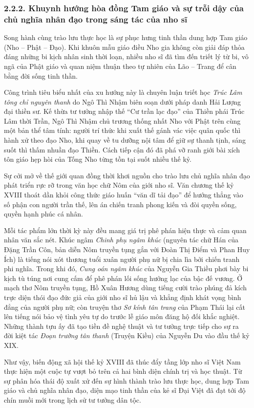 \subsubsection*{2.2.2. Khuynh hướng hòa đồng Tam giáo và sự trỗi dậy của chủ nghĩa nhân đạo trong sáng tác của nho sĩ}

Song hành cùng trào lưu thực học là sự phục hưng tinh thần dung hợp Tam giáo (Nho -- Phật -- Đạo). Khi khuôn mẫu giáo điều Nho gia không còn giải đáp thỏa đáng những bi kịch nhân sinh thời loạn, nhiều nho sĩ đã tìm đến triết lý từ bi, vô ngã của Phật giáo và quan niệm thuận theo tự nhiên của Lão -- Trang để cân bằng đời sống tinh thần.

Công trình tiêu biểu nhất của xu hướng này là chuyên luận triết học \textit{Trúc Lâm tông chỉ nguyên thanh} do Ngô Thì Nhậm biên soạn dưới pháp danh Hải Lượng đại thiền sư. Kế thừa tư tưởng nhập thế ``Cư trần lạc đạo'' của Thiền phái Trúc Lâm thời Trần, Ngô Thì Nhậm chủ trương thống nhất Nho với Phật trên cùng một bản thể tâm tính: người trí thức khi xuất thế gánh vác việc quân quốc thì hành xử theo đạo Nho, khi quay về tu dưỡng nội tâm để giữ sự thanh tịnh, sáng suốt thì thấm nhuần đạo Thiền. Cách tiếp cận đó đã phá vỡ ranh giới bài xích tôn giáo hẹp hòi của Tống Nho từng tồn tại suốt nhiều thế kỷ.

Sự cởi mở về thế giới quan đồng thời khơi nguồn cho trào lưu chủ nghĩa nhân đạo phát triển rực rỡ trong văn học chữ Nôm của giới nho sĩ. Văn chương thế kỷ XVIII thoát dần khỏi công thức giáo huấn ``văn dĩ tải đạo'' để hướng thẳng vào số phận con người trần thế, lên án chiến tranh phong kiến và đòi quyền sống, quyền hạnh phúc cá nhân.

Mỗi tác phẩm lớn thời kỳ này đều mang giá trị phê phán hiện thực và cảm quan nhân văn sắc nét. Khúc ngâm \textit{Chinh phụ ngâm khúc} (nguyên tác chữ Hán của Đặng Trần Côn, bản diễn Nôm truyền tụng gắn với Đoàn Thị Điểm và Phan Huy Ích) là tiếng nói xót thương tuổi xuân người phụ nữ bị chia lìa bởi chiến tranh phi nghĩa. Trong khi đó, \textit{Cung oán ngâm khúc} của Nguyễn Gia Thiều phơi bày bi kịch tù túng nơi cung cấm để phê phán lối sống hưởng lạc của bậc đế vương. Ở mạch thơ Nôm truyền tụng, Hồ Xuân Hương dùng tiếng cười trào phúng đả kích trực diện thói đạo đức giả của giới nho sĩ hủ lậu và khẳng định khát vọng bình đẳng của người phụ nữ; còn truyện thơ \textit{Sơ kính tân trang} của Phạm Thái lại cất lên tiếng nói bảo vệ tình yêu tự do trước lễ giáo môn đăng hộ đối khắc nghiệt. Những thành tựu ấy đã tạo tiền đề nghệ thuật và tư tưởng trực tiếp cho sự ra đời kiệt tác \textit{Đoạn trường tân thanh} (Truyện Kiều) của Nguyễn Du vào đầu thế kỷ XIX.

Như vậy, biến động xã hội thế kỷ XVIII đã thúc đẩy tầng lớp nho sĩ Việt Nam thực hiện một cuộc tự vượt bỏ trên cả hai bình diện chính trị và học thuật. Từ sự phân hóa thái độ xuất xử đến sự hình thành trào lưu thực học, dung hợp Tam giáo và chủ nghĩa nhân đạo, diện mạo tinh thần của kẻ sĩ Đại Việt đã đạt tới độ chín muồi mới trong lịch sử tư tưởng dân tộc.
